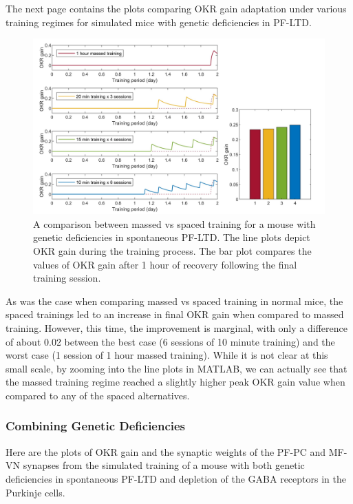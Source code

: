 \documentclass[10pt]{article}
\begin{document}
The next page contains the plots comparing OKR gain adaptation under various training regimes for simulated mice with genetic deficiencies in PF-LTD.

\begin{figure}[h]
    \centering
    \includegraphics[scale=0.18]{images/training_ltd-deficient.jpg}
    \caption{A comparison between massed vs spaced training for a mouse with genetic deficiencies in spontaneous PF-LTD. The line plots depict OKR gain during the training process. The bar plot compares the values of OKR gain after 1 hour of recovery following the final training session.}
    \label{fig:training_ltd-deficient}
\end{figure}

As was the case when comparing massed vs spaced training in normal mice, the spaced trainings led to an increase in final OKR gain when compared to massed training. However, this time, the improvement is marginal, with only a difference of about 0.02 between the best case (6 sessions of 10 minute training) and the worst case (1 session of 1 hour massed training). While it is not clear at this small scale, by zooming into the line plots in MATLAB, we can actually see that the massed training regime reached a slightly higher peak OKR gain value when compared to any of the spaced alternatives.

\newpage

\subsubsection{Combining Genetic Deficiencies}

Here are the plots of OKR gain and the synaptic weights of the PF-PC and MF-VN synapses from the simulated training of a mouse with both genetic deficiencies in spontaneous PF-LTD and depletion of the GABA receptors in the Purkinje cells.
\end{document}
